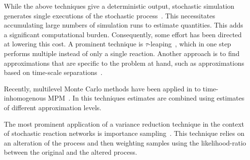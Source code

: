 While the above techniques give a deterministic output, stochastic simulation generates
single executions of the stochastic process~\cite{gillespie1977exact}.
This necessitates accumulating large numbers of simulation runs to estimate
quantities.
This adds a significant computational burden. Consequently, some effort
has been directed at lowering this cost.
A prominent technique is $\tau$-leaping~\cite{gillespie2001approximate},
which in one step performs multiple instead of only a single reaction.
Another approach is to find approximations that are specific to the problem at hand,
such as approximations based on time-scale separations~\cite{cao2005slow,bortolussi2015efficient}.

Recently, multilevel Monte Carlo methods have been applied in to time-inhomogenous
\ac{MPM}~\cite{anderson2018low}. In this techniques estimates are combined
using estimates of different approximation levels.


The most prominent application of a variance reduction technique in the context
of stochastic reaction networks is importance sampling~\cite{kuwahara2008efficient}.
This technique relies on an alteration of the process and then weighting samples
using the likelihood-ratio between the original and the altered process.
% 





